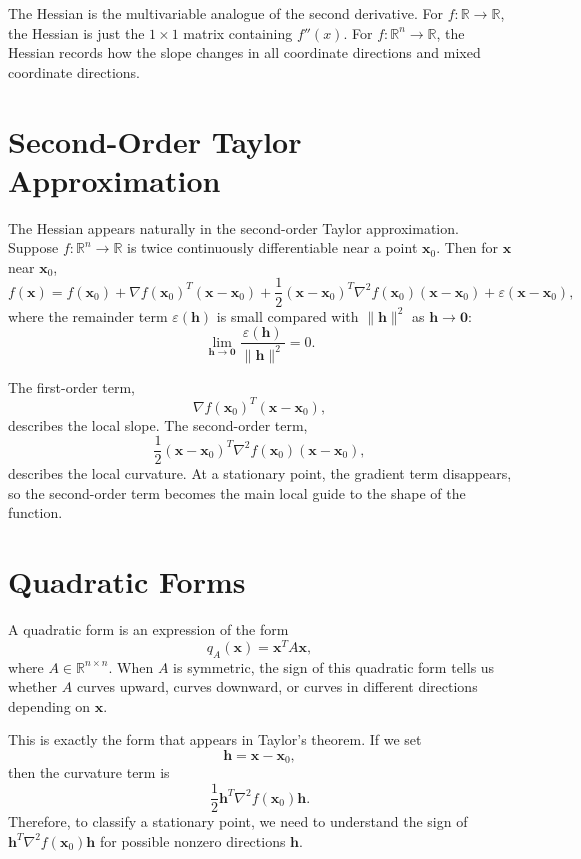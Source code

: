 The Hessian is the multivariable analogue of the second derivative. For \(f:\mathbb{R}\to\mathbb{R}\), the Hessian is just the \(1\times 1\) matrix containing \(f''(x)\). For \(f:\mathbb{R}^n\to\mathbb{R}\), the Hessian records how the slope changes in all coordinate directions and mixed coordinate directions.

\section{Second-Order Taylor Approximation}
\label{mf:taylor-second-order}

The Hessian appears naturally in the second-order Taylor approximation. Suppose \(f:\mathbb{R}^n\to\mathbb{R}\) is twice continuously differentiable near a point \(\mathbf{x}_0\). Then for \(\mathbf{x}\) near \(\mathbf{x}_0\),
\[
    f(\mathbf{x})
    =
    f(\mathbf{x}_0)
    + \nabla f(\mathbf{x}_0)^T(\mathbf{x}-\mathbf{x}_0)
    + \frac{1}{2}(\mathbf{x}-\mathbf{x}_0)^T
        \nabla^2 f(\mathbf{x}_0)
        (\mathbf{x}-\mathbf{x}_0)
    + \varepsilon(\mathbf{x}-\mathbf{x}_0),
\]
where the remainder term \(\varepsilon(\mathbf{h})\) is small compared with \(\|\mathbf{h}\|^2\) as \(\mathbf{h}\to \mathbf{0}\):
\[
    \lim_{\mathbf{h}\to \mathbf{0}}
    \frac{\varepsilon(\mathbf{h})}{\|\mathbf{h}\|^2}=0.
\]

The first-order term,
\[
    \nabla f(\mathbf{x}_0)^T(\mathbf{x}-\mathbf{x}_0),
\]
describes the local slope. The second-order term,
\[
    \frac{1}{2}(\mathbf{x}-\mathbf{x}_0)^T
        \nabla^2 f(\mathbf{x}_0)
        (\mathbf{x}-\mathbf{x}_0),
\]
describes the local curvature. At a stationary point, the gradient term disappears, so the second-order term becomes the main local guide to the shape of the function.

\section{Quadratic Forms}
\label{mf:quadratic-forms}

A quadratic form is an expression of the form
\[
    q_A(\mathbf{x})=\mathbf{x}^T A\mathbf{x},
\]
where \(A\in\mathbb{R}^{n\times n}\). When \(A\) is symmetric, the sign of this quadratic form tells us whether \(A\) curves upward, curves downward, or curves in different directions depending on \(\mathbf{x}\).

This is exactly the form that appears in Taylor's theorem. If we set
\[
    \mathbf{h}=\mathbf{x}-\mathbf{x}_0,
\]
then the curvature term is
\[
    \frac{1}{2}\mathbf{h}^T\nabla^2 f(\mathbf{x}_0)\mathbf{h}.
\]
Therefore, to classify a stationary point, we need to understand the sign of \(\mathbf{h}^T\nabla^2 f(\mathbf{x}_0)\mathbf{h}\) for possible nonzero directions \(\mathbf{h}\).

